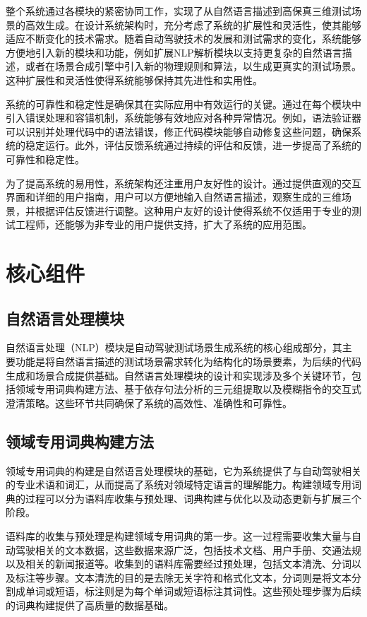 整个系统通过各模块的紧密协同工作，实现了从自然语言描述到高保真三维测试场景的高效生成。在设计系统架构时，充分考虑了系统的扩展性和灵活性，使其能够适应不断变化的技术需求。随着自动驾驶技术的发展和测试需求的变化，系统能够方便地引入新的模块和功能，例如扩展NLP解析模块以支持更复杂的自然语言描述，或者在场景合成引擎中引入新的物理规则和算法，以生成更真实的测试场景。这种扩展性和灵活性使得系统能够保持其先进性和实用性。

系统的可靠性和稳定性是确保其在实际应用中有效运行的关键。通过在每个模块中引入错误处理和容错机制，系统能够有效地应对各种异常情况。例如，语法验证器可以识别并处理代码中的语法错误，修正代码模块能够自动修复这些问题，确保系统的稳定运行。此外，评估反馈系统通过持续的评估和反馈，进一步提高了系统的可靠性和稳定性。

为了提高系统的易用性，系统架构还注重用户友好性的设计。通过提供直观的交互界面和详细的用户指南，用户可以方便地输入自然语言描述，观察生成的三维场景，并根据评估反馈进行调整。这种用户友好的设计使得系统不仅适用于专业的测试工程师，还能够为非专业的用户提供支持，扩大了系统的应用范围。

\section{核心组件}
\subsection{自然语言处理模块}
自然语言处理（NLP）模块是自动驾驶测试场景生成系统的核心组成部分，其主要功能是将自然语言描述的测试场景需求转化为结构化的场景要素，为后续的代码生成和场景合成提供基础。自然语言处理模块的设计和实现涉及多个关键环节，包括领域专用词典构建方法、基于依存句法分析的三元组提取以及模糊指令的交互式澄清策略。这些环节共同确保了系统的高效性、准确性和可靠性。

\subsection{领域专用词典构建方法}
领域专用词典的构建是自然语言处理模块的基础，它为系统提供了与自动驾驶相关的专业术语和词汇，从而提高了系统对领域特定语言的理解能力。构建领域专用词典的过程可以分为语料库收集与预处理、词典构建与优化以及动态更新与扩展三个阶段。

语料库的收集与预处理是构建领域专用词典的第一步。这一过程需要收集大量与自动驾驶相关的文本数据，这些数据来源广泛，包括技术文档、用户手册、交通法规以及相关的新闻报道等。收集到的语料库需要经过预处理，包括文本清洗、分词以及标注等步骤。文本清洗的目的是去除无关字符和格式化文本，分词则是将文本分割成单词或短语，标注则是为每个单词或短语标注其词性。这些预处理步骤为后续的词典构建提供了高质量的数据基础。

